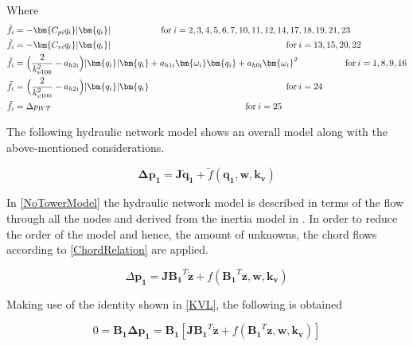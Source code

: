 Where\\
\begin{align}
\tilde{f}_i &= -\bm{C_{pi} q_i} |\bm{q_i}|  \hskip 2cm  \text{for}\: i = 2,3,4,5,6,7,10,11,12,14,17,18,19,21,23 \\
\tilde{f}_i &= -\bm{C_{vi} q_i} |\bm{q_i}|  \hspace{6.95cm} \text{for}\:i = 13,15,20,22\\
\tilde{f}_i &= \Big(\frac{2}{k_{v100}^2} - a_{h2i}\Big)|\bm{q_i}| \bm{q_i}  + a_{h1i} \bm{\omega_{i}} \bm{q_i} + a_{h0i}\bm{{\omega_i}}^2 \hspace{1.875cm} \text{for}\: i = 1,8,9,16 \\
\tilde{f}_i &= \Big(\frac{2}{k_{v100}^2} - a_{h2i}\Big)|\bm{q_i}| \bm{q_i}  \hspace{5.43cm} \text{for}\: i = 24 \\
\tilde{f}_i &= \Delta p_{WT}  \hspace{7.69cm} \text{for}\:i = 25
\end{align}

The following hydraulic network model shows an overall model along with the above-mentioned considerations.%

\begin{equation}
  \bm{\Delta p_1} =  \bm{J} \bm{\dot{q}_1} + \tilde{f}(\bm{q_1}, \bm{w}, \bm{k_v})
  \label{NoTowerModel}
\end{equation}

In \eqref{NoTowerModel} the hydraulic network model is described in terms of the 
flow through all the nodes and derived from the inertia model in . In order to reduce the order of the model and hence, 
the amount of unknowns, the chord flows according to \eqref{ChordRelation} are applied. 

\begin{equation}
  \Delta \bm{p_1} =  \bm{J} {\bm{B_1}}^T \bm{\dot{z}} + f({\bm{B_1}}^T \bm{z}, \bm{w}, \bm{k_v})
  \label{ChordsModel}
\end{equation}

Making use of the identity shown in \eqref{KVL}, the following is obtained

\begin{equation}
  0 = \bm{B_1} \bm{\Delta p_1} = \bm{B_1} [ \bm{J {B_1}}^T \bm{\dot{z}} + f({\bm{B_1}}^T \bm{z}, \bm{w}, \bm{k_v})] 
 \end{equation}

